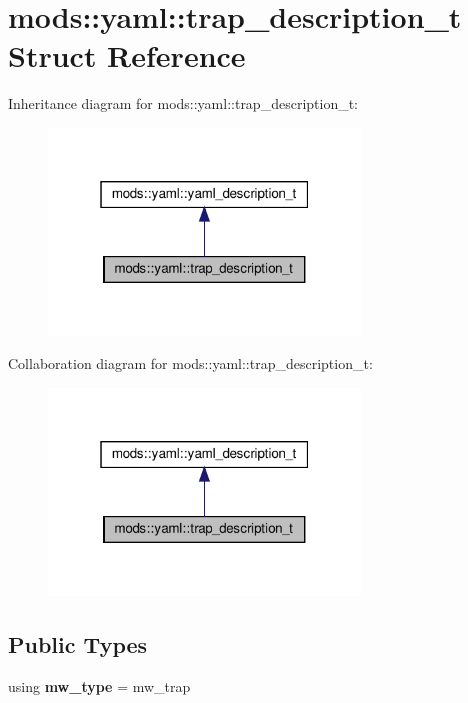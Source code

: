 \hypertarget{structmods_1_1yaml_1_1trap__description__t}{}\section{mods\+:\+:yaml\+:\+:trap\+\_\+description\+\_\+t Struct Reference}
\label{structmods_1_1yaml_1_1trap__description__t}


Inheritance diagram for mods\+:\+:yaml\+:\+:trap\+\_\+description\+\_\+t\+:
\nopagebreak
\begin{figure}[H]
\begin{center}
\leavevmode
\includegraphics[width=235pt]{structmods_1_1yaml_1_1trap__description__t__inherit__graph}
\end{center}
\end{figure}


Collaboration diagram for mods\+:\+:yaml\+:\+:trap\+\_\+description\+\_\+t\+:
\nopagebreak
\begin{figure}[H]
\begin{center}
\leavevmode
\includegraphics[width=235pt]{structmods_1_1yaml_1_1trap__description__t__coll__graph}
\end{center}
\end{figure}
\subsection*{Public Types}
\begin{DoxyCompactItemize}
\item 
\mbox{\label{structmods_1_1yaml_1_1trap__description__t_a45861756a52d38b6836df459a6fcc487}} 
using {\bfseries mw\+\_\+type} = mw\+\_\+trap
\end{DoxyCompactItemize}
